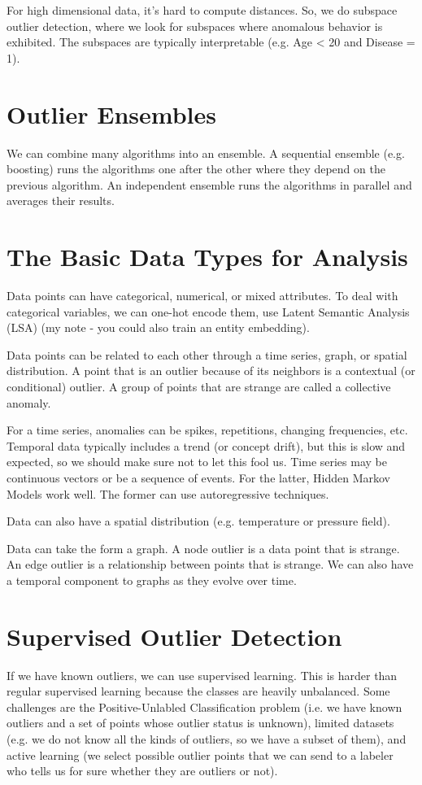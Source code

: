 \documentclass[a4paper]{article}
\begin{document}
For high dimensional data, it's hard to compute distances. So, we do subspace
outlier detection, where we look for subspaces where anomalous behavior is
exhibited. The subspaces are typically interpretable (e.g. Age < 20 and
Disease = 1).

\section{Outlier Ensembles}
We can combine many algorithms into an ensemble. A sequential ensemble (e.g.
boosting) runs the algorithms one after the other where they depend on the
previous algorithm. An independent ensemble runs the algorithms in parallel
and averages their results.

\section{The Basic Data Types for Analysis}
Data points can have categorical, numerical, or mixed attributes. To deal
with categorical variables, we can one-hot encode them, use Latent Semantic
Analysis (LSA) (my note - you could also train an entity embedding).

Data points can be related to each other through a time series, graph, or
spatial distribution. A point that is an outlier because of its neighbors is a
contextual (or conditional) outlier. A group of points that are strange are
called a collective anomaly.

For a time series, anomalies can be spikes, repetitions, changing frequencies,
etc. Temporal data typically includes a trend (or concept drift), but this is
slow and expected, so we should make sure not to let this fool us. Time series
may be continuous vectors or be a sequence of events. For the latter, Hidden
Markov Models work well. The former can use autoregressive techniques.

Data can also have a spatial distribution (e.g. temperature or pressure field).

Data can take the form a graph. A node outlier is a data point that is strange.
An edge outlier is a relationship between points that is strange. We can also
have a temporal component to graphs as they evolve over time.

\section{Supervised Outlier Detection}
If we have known outliers, we can use supervised learning. This is harder than
regular supervised learning because the classes are heavily unbalanced. Some
challenges are the Positive-Unlabled Classification problem (i.e. we have known
outliers and a set of points whose outlier status is unknown), limited datasets
(e.g. we do not know all the kinds of outliers, so we have a subset of them),
and active learning (we select possible outlier points that we can send to a
labeler who tells us for sure whether they are outliers or not).
\end{document}
